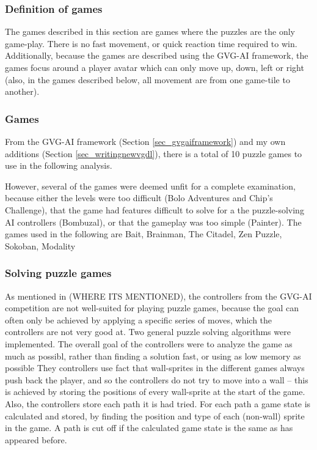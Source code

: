 \documentclass[a4paper,titlepage,final]{report}
\begin{document}
\subsubsection*{Definition of games}
The games described in this section are games where the puzzles are the only game-play. There is no fast movement, or quick reaction time required to win. Additionally, because the games are described using the GVG-AI framework, the games focus around a player avatar which can only move up, down, left or right (also, in the games described below, all movement are from one game-tile to another).

\subsubsection*{Games} 
From the GVG-AI framework (Section \ref{sec_gvgaiframework}) and my own additions (Section \ref{sec_writingnewvgdl}), there is a total of 10 puzzle games to use in the following analysis.

However, several of the games were deemed unfit for a complete examination, because either the levels were too difficult (Bolo Adventures and Chip's Challenge), that the game had features difficult to solve for a the puzzle-solving AI controllers (Bombuzal), or that the gameplay was too simple (Painter).
The games used in the following are Bait, Brainman, The Citadel, Zen Puzzle, Sokoban, Modality


\subsubsection*{Solving puzzle games} 
As mentioned in (WHERE ITS MENTIONED), the controllers from the GVG-AI competition are not well-suited for playing puzzle games, because the goal can often only be achieved by applying a specific series of moves, which the controllers are not very good at.
Two general puzzle solving algorithms were implemented. The overall goal of the controllers were to analyze the game as much as possibl, rather than finding a solution fast, or using as low memory as possible
They controllers use fact that wall-sprites in the different games always push back the player, and so the controllers do not try to move into a wall -- this is achieved by storing the positions of every wall-sprite at the start of the game. 
Also, the controllers store each path it is had tried. For each path a game state is calculated and stored, by finding the position and type of each (non-wall) sprite in the game. A path is cut off if the calculated game state is the same as has appeared before.
\end{document}
